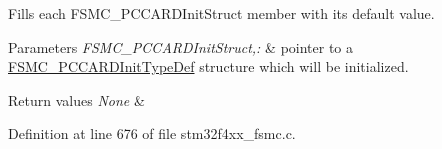 Fills each F\-S\-M\-C\-\_\-\-P\-C\-C\-A\-R\-D\-Init\-Struct member with its default value. 


\begin{DoxyParams}{Parameters}
{\em F\-S\-M\-C\-\_\-\-P\-C\-C\-A\-R\-D\-Init\-Struct,\-:} & pointer to a \hyperlink{struct_f_s_m_c___p_c_c_a_r_d_init_type_def}{F\-S\-M\-C\-\_\-\-P\-C\-C\-A\-R\-D\-Init\-Type\-Def} structure which will be initialized. \\
\hline
\end{DoxyParams}

\begin{DoxyRetVals}{Return values}
{\em None} & \\
\hline
\end{DoxyRetVals}


Definition at line 676 of file stm32f4xx\-\_\-fsmc.\-c.

